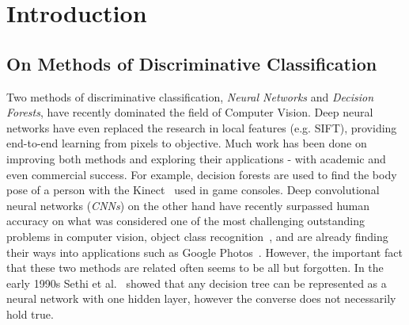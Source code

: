 \documentclass[thesis]{subfiles}
\begin{document}

\chapter{Introduction}  %

\ifpdf
    \graphicspath{{Figs/Raster/}{Figs/PDF/}{Figs/}}
\else
    \graphicspath{{Figs/Vector/}{Figs/}}
\fi


\section{On Methods of Discriminative Classification} %

Two methods of discriminative classification, \emph{Neural Networks} and \emph{Decision Forests}, have recently dominated the field of Computer Vision. Deep neural networks have even replaced the research in local features (e.g. SIFT), providing end-to-end learning from pixels to objective. Much work has been done on improving both methods and exploring their applications - with academic and even commercial success. For example, decision forests are used to find the body pose of a person with the Kinect~\cite{conf/cvpr/ShottonFCSFMKB11} used in game consoles. Deep convolutional neural networks (\emph{CNNs}) on the other hand have recently surpassed human accuracy on what was considered one of the most challenging outstanding problems in computer vision, object class recognition~\cite{journals/corr/HeZR015}, and are already finding their ways into applications such as Google Photos~\cite{googlephotos}. However, the important fact that these two methods are related often seems to be all but forgotten. In the early 1990s Sethi et al.~\cite{Sethi1990} showed that any decision tree can be represented as a neural network with one hidden layer, however the converse does not necessarily hold true.
\end{document}
